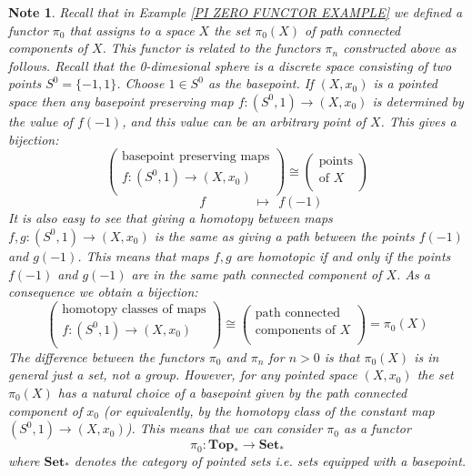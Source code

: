 \documentclass[11pt, letterpaper, oneside]{report}
\theoremstyle{pplain}
\theoremstyle{ddefinition}
\newtheorem{note}[theorem]{Note}
\theoremstyle{nnn}
\theoremstyle{eexercise}
\newcommand{\Top}{{\mathbf{Top}}}
\newcommand{\Set}{{\mathbf{Set}}}
\begin{document}
\begin{note}
Recall that in Example \ref{PI ZERO FUNCTOR EXAMPLE} we defined a functor $\pi_{0}$ 
that assigns to a space $X$ the set $\pi_{0}(X)$ of path connected components of $X$. This functor is 
related to the functors $\pi_{n}$ constructed above as follows. Recall that the 0-dimesional sphere is a discrete 
space consisting of two points $S^{0} = \{-1, 1\}$. Choose $1\in S^{0}$ as the basepoint. If $(X, x_{0})$ is 
a pointed space then any basepoint preserving map $f\colon (S^{0}, 1) \to (X, x_{0})$ is  determined 
by the value of $f(-1)$, and this value can be an arbitrary point of $X$. 
This gives a bijection:
$$
\begin{pmatrix}
\text{basepoint preserving maps} \\[1mm]
\text{$f\colon (S^{0}, 1) \to (X, x_{0})$} \\
\end{pmatrix}
\cong 
\begin{pmatrix}
\text{points} \\[1mm]
\text{of $X$} \\
\end{pmatrix} 
$$
$$
\ \ \ \ \ \ \ \ \ \ \ \ \ \ \ \ \ f \ \ \ \ \ \ \ \ \ \ \ \ \ \ \ \ \ \mapsto \ \ f(-1)
$$
It is also easy to see that giving a homotopy between maps $f, g\colon  (S^{0}, 1) \to (X, x_{0})$
is the same as giving a path between the points $f(-1)$ and $g(-1)$. This means that  maps 
$f, g$ are homotopic if and only if the points $f(-1)$ and $g(-1)$ are in the same path connected component
of $X$. As a consequence we obtain a bijection: 
$$
\begin{pmatrix}
\text{homotopy classes of maps} \\[1mm]
\text{$f\colon (S^{0}, 1) \to (X, x_{0})$} \\
\end{pmatrix}
\cong 
\begin{pmatrix}
\text{path connected} \\[1mm]
\text{components of $X$} \\
\end{pmatrix} 
= \pi_{0}(X)
$$
The difference between the functors $\pi_{0}$ and $\pi_{n}$ for $n> 0$ is that $\pi_{0}(X)$ is in general just 
a set, not a group. However, for any pointed space $(X, x_{0})$ the set $\pi_{0}(X)$ has a natural choice 
of a basepoint given by the path connected component of $x_{0}$ (or equivalently, by the homotopy class of the 
constant map $(S^{0}, 1) \to (X, x_{0})$). This means that we can consider $\pi_{0}$ as a functor 
$$\pi_{0}\colon \Top_{\ast} \to \Set_{\ast}$$
where $\Set_{\ast}$ denotes the category of pointed sets i.e. sets equipped with a basepoint. 

\end{note}
\end{document}
